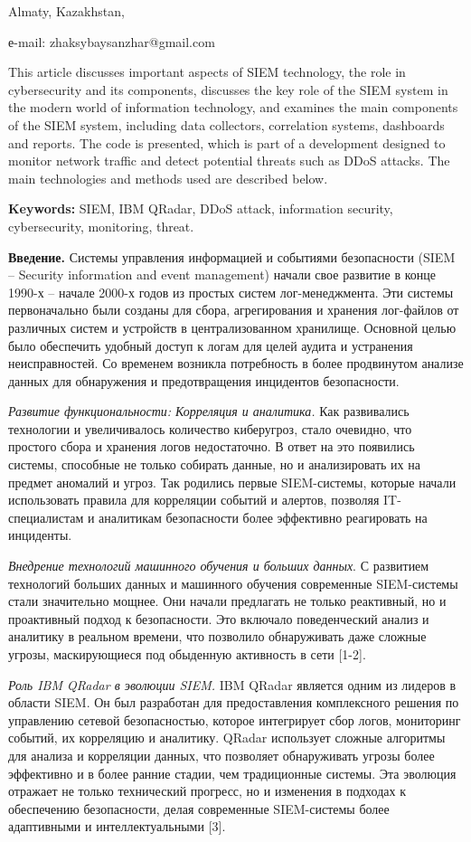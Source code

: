 Almaty, Kazakhstan,

е-mail: zhaksybaysanzhar@gmail.com

This article discusses important aspects of SIEM technology, the role in
cybersecurity and its components, discusses the key role of the SIEM
system in the modern world of information technology, and examines the
main components of the SIEM system, including data collectors,
correlation systems, dashboards and reports. The code is presented,
which is part of a development designed to monitor network traffic and
detect potential threats such as DDoS attacks. The main technologies and
methods used are described below.

\textbf{Keywords:} SIEM, IBM QRadar, DDoS attack, information security,
cybersecurity, monitoring, threat.

\textbf{Введение.} Системы управления информацией и событиями
безопасности (SIEM -- Security information and event management) начали
свое развитие в конце 1990-х -- начале 2000-х годов из простых систем
лог-менеджмента. Эти системы первоначально были созданы для сбора,
агрегирования и хранения лог-файлов от различных систем и устройств в
централизованном хранилище. Основной целью было обеспечить удобный
доступ к логам для целей аудита и устранения неисправностей. Со временем
возникла потребность в более продвинутом анализе данных для обнаружения
и предотвращения инцидентов безопасности.

\emph{Развитие функциональности: Корреляция и аналитика.} Как
развивались технологии и увеличивалось количество киберугроз, стало
очевидно, что простого сбора и хранения логов недостаточно. В ответ на
это появились системы, способные не только собирать данные, но и
анализировать их на предмет аномалий и угроз. Так родились первые
SIEM-системы, которые начали использовать правила для корреляции событий
и алертов, позволяя IT-специалистам и аналитикам безопасности более
эффективно реагировать на инциденты.

\emph{Внедрение технологий машинного обучения и больших данных}. С
развитием технологий больших данных и машинного обучения современные
SIEM-системы стали значительно мощнее. Они начали предлагать не только
реактивный, но и проактивный подход к безопасности. Это включало
поведенческий анализ и аналитику в реальном времени, что позволило
обнаруживать даже сложные угрозы, маскирующиеся под обыденную активность
в сети {[}1-2{]}.

\emph{Роль IBM QRadar в эволюции SIEM.} IBM QRadar является одним из
лидеров в области SIEM. Он был разработан для предоставления
комплексного решения по управлению сетевой безопасностью, которое
интегрирует сбор логов, мониторинг событий, их корреляцию и аналитику.
QRadar использует сложные алгоритмы для анализа и корреляции данных, что
позволяет обнаруживать угрозы более эффективно и в более ранние стадии,
чем традиционные системы. Эта эволюция отражает не только технический
прогресс, но и изменения в подходах к обеспечению безопасности, делая
современные SIEM-системы более адаптивными и интеллектуальными {[}3{]}.

